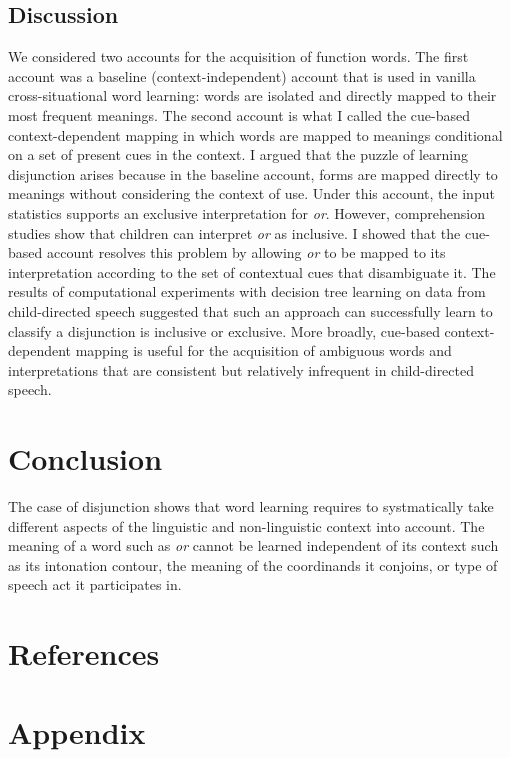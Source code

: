 \documentclass[floatsintext,man]{apa6}
\theoremstyle{definition}
\theoremstyle{definition}
\theoremstyle{definition}
\theoremstyle{remark}
\begin{document}
\subsection{Discussion}\label{discussion-1}

We considered two accounts for the acquisition of function words. The
first account was a baseline (context-independent) account that is used
in vanilla cross-situational word learning: words are isolated and
directly mapped to their most frequent meanings. The second account is
what I called the cue-based context-dependent mapping in which words are
mapped to meanings conditional on a set of present cues in the context.
I argued that the puzzle of learning disjunction arises because in the
baseline account, forms are mapped directly to meanings without
considering the context of use. Under this account, the input statistics
supports an exclusive interpretation for \emph{or}. However,
comprehension studies show that children can interpret \emph{or} as
inclusive. I showed that the cue-based account resolves this problem by
allowing \emph{or} to be mapped to its interpretation according to the
set of contextual cues that disambiguate it. The results of
computational experiments with decision tree learning on data from
child-directed speech suggested that such an approach can successfully
learn to classify a disjunction is inclusive or exclusive. More broadly,
cue-based context-dependent mapping is useful for the acquisition of
ambiguous words and interpretations that are consistent but relatively
infrequent in child-directed speech.

\section{Conclusion}\label{conclusion}

The case of disjunction shows that word learning requires to
systmatically take different aspects of the linguistic and
non-linguistic context into account. The meaning of a word such as
\emph{or} cannot be learned independent of its context such as its
intonation contour, the meaning of the coordinands it conjoins, or type
of speech act it participates in.

\newpage

\section{References}\label{references}

\section{Appendix}\label{appendix}
\end{document}
